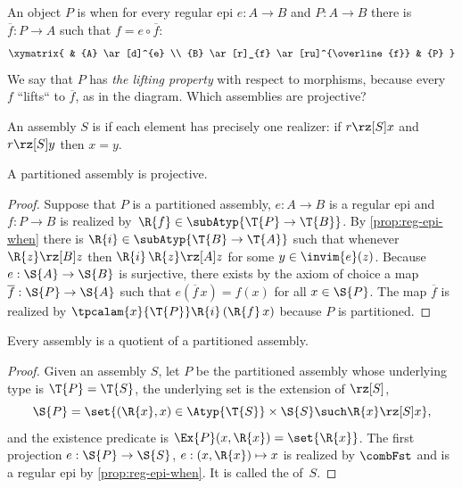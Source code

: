 An object $P$ is  when for every regular epi $e : A \to B$ and $P : A \to B$ there is $\overline{f} : P \to A$ such that $f = e \circ \overline{f}$:
%
\begin{equation*}
  \xymatrix{
    &
    {A}
    \ar[d]^{e}
    \\
    {B}
    \ar[r]_{f}
    \ar[ru]^{\overline{f}}
    &
    {P}
  }
\end{equation*}
%
We say that $P$ has \emph{the lifting property} with respect to morphisms, because every~$f$ ``lifts`` to $\overline{f}$, as in the diagram.  Which assemblies are projective?

\begin{definition}
  An assembly $S$ is  if each element has precisely one realizer:
  if $r \rz[S] x$ and $r \rz[S] y$ then $x = y$.
\end{definition}

\begin{proposition}
  \label{prop:partitioned-projective}
  A partitioned assembly is projective.
\end{proposition}

\begin{proof}
  Suppose that $P$ is a partitioned assembly, $e : A \to B$ is a regular epi and $f : P \to B$ is realized by~$\R{f} \in \subAtyp{\T{P} \to \T{B}}$.
  By \cref{prop:reg-epi-when} there is $\R{i} \in \subAtyp{\T{B} \to \T{A}}$ such that whenever $\R{z} \rz[B] z$ then $\R{i}\,\R{z} \rz[A] z$ for some $y \in \invim{e}(z)$.
  Because $e : \S{A} \to \S{B}$ is surjective, there exists by the axiom of choice a map $\overline{f} : \S{P} \to \S{A}$ such that $e(\overline{f}\, x) = f(x)$ for all $x \in \S{P}$. The map $\overline{f}$ is realized by $\tpcalam{x}{\T{P}} \R{i}\,(\R{f}\,x)$ because $P$ is partitioned.
\end{proof}

\begin{proposition}
  \label{prop:partitioned-covers}
  Every assembly is a quotient of a partitioned assembly.
\end{proposition}

\begin{proof}
  Given an assembly $S$, let $P$ be the partitioned assembly whose underlying type is $\T{P} = \T{S}$, the underlying set is the extension of $\rz[S]$,
  \begin{equation*}
    \S{P} = \set{ (\R{x}, x) \in \Atyp{\T{S}} \times \S{S} \such \R{x} \rz[S] x},
  \end{equation*}
  and the existence predicate is $\Ex{P}(x, \R{x}) = \set{\R{x}}$.
  The first projection $e : \S{P} \to \S{S}$, $e : (x, \R{x}) \mapsto x$ is realized by $\combFst$ and is a regular epi by \cref{prop:reg-epi-when}.
  It is called the  of~$S$.
\end{proof}


